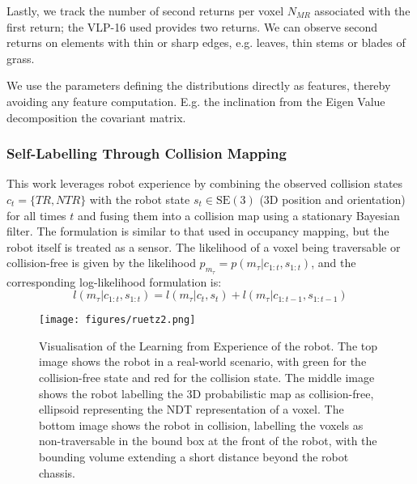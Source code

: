 Lastly, we track the number of second returns per voxel $N_{MR}$ associated with the first return; the VLP-16 used provides two returns. We can observe second returns on elements with thin or sharp edges, e.g. leaves, thin stems or blades of grass. 

We use the parameters defining the distributions directly as features, thereby avoiding any feature computation. E.g. the inclination from the Eigen Value decomposition the covariant matrix. 

\subsubsection{Self-Labelling Through Collision Mapping}
\label{subsec:collision_mapping}
This work leverages robot experience by combining the observed collision states $c_t = \{TR, NTR\}$ with the robot state $s_t \in \text{SE}(3)$ (3D position and orientation) for all times $t$ and fusing them into a collision map using a stationary Bayesian filter. The formulation is similar to that used in occupancy mapping, but the robot itself is treated as a sensor. The likelihood of a voxel being traversable or collision-free is given by the likelihood $p_{m_\tau} = p( m_\tau| c_{1:t}, s_{1:t})$, and the corresponding log-likelihood formulation is:
%
\begin{equation}
    \label{eq:lodds_cm}    
    l(m_{\tau} | c_{1:t}, s_{1:t}) = l(m_\tau | c_t,  s_{t}) +l(m_{\tau} | c_{1:t-1}, s_{1:t-1})
\end{equation}

\begin{figure}[ht]
    \centering
    \texttt{[image: figures/ruetz2.png]}
    \caption{Visualisation of the Learning from Experience of the robot. The top image shows the robot in a real-world scenario, with green for the collision-free state and red for the collision state. The middle image shows the robot labelling the 3D probabilistic map as collision-free, ellipsoid representing the NDT representation of a voxel. The bottom image shows the robot in collision, labelling the voxels as non-traversable in the bound box at the front of the robot, with the bounding volume extending a short distance beyond the robot chassis.}
    \label{fig:robot_collisions}
\end{figure}

